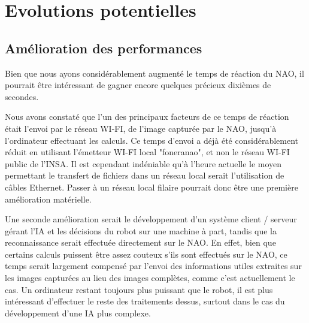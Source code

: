\section{Evolutions potentielles}
\label{sec:Evolutions potentielles}

  \subsection{Amélioration des performances}
  \label{sub:Améliorations des performances}
    \par Bien que nous ayons considérablement augmenté le temps de réaction du NAO, il pourrait être intéressant de gagner encore quelques précieux dixièmes de secondes.
    \par Nous avons constaté que l'un des principaux facteurs de ce temps de réaction était l'envoi par le réseau WI-FI, de l'image capturée par le NAO, jusqu'à l'ordinateur effectuant les calculs.
    Ce temps d'envoi a déjà été considérablement réduit en utilisant l'émetteur WI-FI local "foneranao", et non le réseau WI-FI public de l'INSA.
    Il est cependant indéniable qu'à l'heure actuelle le moyen permettant le transfert de fichiers dans un réseau local serait l'utilisation de câbles Ethernet.
    Passer à un réseau local filaire pourrait donc être une première amélioration matérielle.
    \par Une seconde amélioration serait le développement d'un système client / serveur gérant l'IA et les décisions du robot sur une machine à part, tandis que la reconnaissance serait effectuée directement sur le NAO.
    En effet, bien que certains calculs puissent être assez couteux s'ils sont effectués sur le NAO, ce temps serait largement compensé par l'envoi des informations utiles extraites sur les images capturées au lieu des images complètes, comme c'est actuellement le cas.
    Un ordinateur restant toujours plus puissant que le robot, il est plus intéressant d'effectuer le reste des traitements dessus, surtout dans le cas du développement d'une IA plus complexe.

